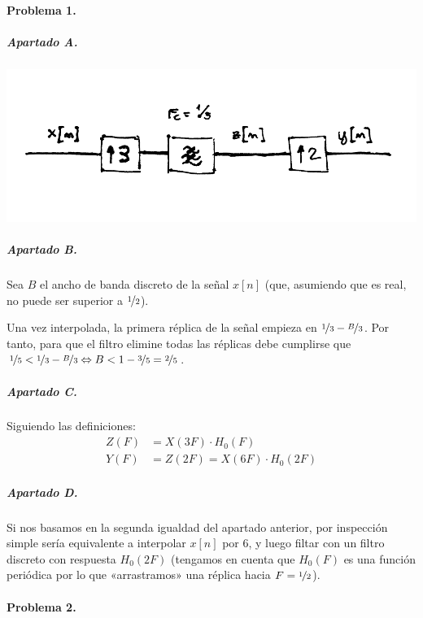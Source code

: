 


\startpage

\paragraph{Problema 1.}

\subparagraph{Apartado A.} \hspace{1em}

\includegraphics[width=\textwidth]{T7-p1a}

\subparagraph{Apartado B.}

Sea $B$ el ancho de banda discreto de la señal $x[n]$ (que, asumiendo que es
real, no puede ser superior a $\nicefrac{1}{2}$).

Una vez interpolada, la primera réplica de la señal empieza en
$\nicefrac{1}{3} - \nicefrac{B}{3}$. Por tanto, para que el filtro elimine
todas las réplicas debe cumplirse que $\nicefrac{1}{5} < \nicefrac{1}{3} -
\nicefrac{B}{3} \Leftrightarrow B < 1 - \nicefrac{3}{5} = \nicefrac{2}{5}$.

\subparagraph{Apartado C.}

Siguiendo las definiciones:
%
\begin{align*}
  Z(F) &= X(3F) \cdot H_0(F) \\
  Y(F) &= Z(2F) = X(6F) \cdot H_0(2F)
\end{align*}

\subparagraph{Apartado D.}

Si nos basamos en la segunda igualdad del apartado anterior, por inspección
simple sería equivalente a interpolar $x[n]$ por 6, y luego filtar con un
filtro discreto con respuesta $H_0(2F)$ (tengamos en cuenta que $H_0(F)$
es una función periódica por lo que «arrastramos» una réplica hacia
$F=\nicefrac{1}{2}$).

\finishpage
\startpage

\paragraph{Problema 2.}

